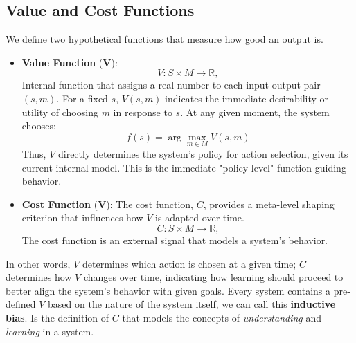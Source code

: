 \documentclass[]{article}
\begin{document}
\subsection{Value and Cost Functions}
We define two hypothetical functions that measure how good an output is.
\begin{itemize}
	\item \textbf{Value Function} ($\mathbf{V}$):
	\[ V: S \times M \to \mathbb{R}, \]
	Internal function that assigns a real number to each input-output pair $(s, m)$. For a fixed $s$, $V(s, m)$ indicates the immediate desirability or utility of choosing $m$ in response to $s$.
	At any given moment, the system chooses:
	\[ f(s) = \arg \max_{m \in M} V(s, m) \]
	Thus, $V$ directly determines the system's policy for action selection, given its current internal model. This is the immediate "policy-level" function guiding behavior.
	\item \textbf{Cost Function} ($\mathbf{V}$): The cost function, $C$, provides a meta-level shaping criterion that influences how $V$ is adapted over time.
	\[ C: S \times M \to \mathbb{R}, \]
	The cost function is an external signal that models a system's behavior.
\end{itemize}
In other words, $V$ determines which action is chosen at a given time; $C$ determines how $V$ changes over time, indicating how learning should proceed to better align the system's behavior with given goals. Every system contains a pre-defined $V$ based on the nature of the system itself, we can call this \textbf{inductive bias}. Is the definition of $C$ that models the concepts of \textit{understanding} and \textit{learning} in a system.
\end{document}
